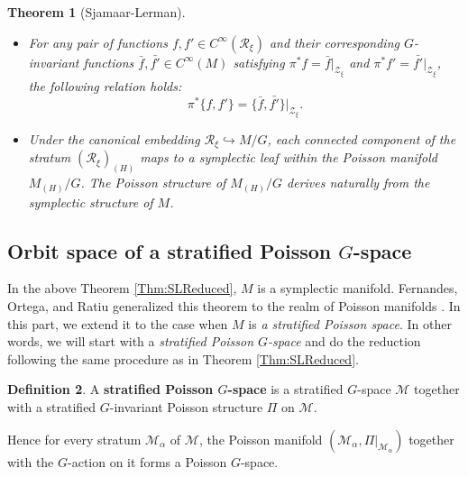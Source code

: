 \documentclass[12pt]{amsart}
\newtheorem{theorem}{Theorem}[section]
\theoremstyle{definition}
\newtheorem{definition}[theorem]{Definition}
\numberwithin{equation}{section}
\newcommand{\CinfM}{C^\infty(M)}
\newcommand{\Cinf}{C^\infty}
\newcommand{\Zxi}{\mathcal{Z}_{\xi}}
\newcommand{\Reducedxi}{\mathcal{R}_\xi}
\newcommand{\PoissonBracket}[1]{\{#1\}}
\begin{document}
\begin{theorem}[Sjamaar-Lerman]
\begin{itemize}
			\item[(6)] For any pair of functions $f,f'\in \Cinf(\Reducedxi)$ and their corresponding $G$-invariant functions $\bar{f},\bar{f'}\in \CinfM$ satisfying $\pi^*f=\bar{f}|_{\Zxi}$ and $\pi^*f'=\bar{f'}|_{\Zxi}$, the following relation holds:
			$$
			\pi^*\PoissonBracket{f,f'}=\PoissonBracket{\bar{f},\bar{f'}}|_{\Zxi}
			.$$
			
			\item[(7)] Under the canonical embedding $\Reducedxi\hookrightarrow M/G$, each connected component of the stratum $(\Reducedxi)_{(H)}$ maps to a symplectic leaf within the Poisson manifold $M_{(H)}/G$. The Poisson structure of $M_{(H)}/G$ derives naturally from the symplectic structure of $M$.
		\end{itemize}
		
	\end{theorem}
	
	
	
 
	
\subsection{Orbit space of a stratified Poisson $G$-space}
In the above Theorem \ref{Thm:SLReduced},  $M$ is a symplectic manifold.   Fernandes, Ortega, and   Ratiu generalized this theorem to the realm of  Poisson manifolds \cite{FernandesOrtegaRatu}.  
In this part, we extend it to the case when $M$ is \emph{a stratified Poisson space}. In other words, we will start with a \textit{stratified Poisson $G$-space} and do the reduction following the same procedure as in Theorem \ref{Thm:SLReduced}. 
	
	
\begin{definition}\label{Defn:stratifiedPoissonGspace}A \textbf{stratified Poisson $G$-space} is   a   stratified $G$-space $\mathcal{M}$ together with a
		stratified $G$-invariant Poisson structure $\Pi$ on $ \mathcal{M}  $.  \end{definition}

 Hence for every stratum $\mathcal{M}_{\alpha}$ of $\mathcal{M}$, the Poisson manifold $(\mathcal{M}_{\alpha},\Pi|_{\mathcal{M}_{\alpha}})$ together with the $G$-action on it forms a Poisson $G$-space.
\end{document}

